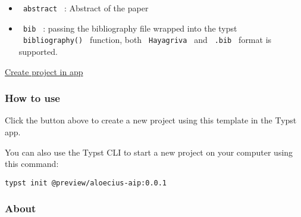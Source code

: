 \begin{itemize}
\tightlist
\item
  \texttt{\ abstract\ } : Abstract of the paper
\item
  \texttt{\ bib\ } : passing the bibliography file wrapped into the
  typst \texttt{\ bibliography()\ } function, both
  \texttt{\ Hayagriva\ } and \texttt{\ .bib\ } format is supported.
\end{itemize}

\href{/app?template=aloecius-aip&version=0.0.1}{Create project in app}

\subsubsection{How to use}\label{how-to-use}

Click the button above to create a new project using this template in
the Typst app.

You can also use the Typst CLI to start a new project on your computer
using this command:

\begin{verbatim}
typst init @preview/aloecius-aip:0.0.1
\end{verbatim}



\subsubsection{About}\label{about}

